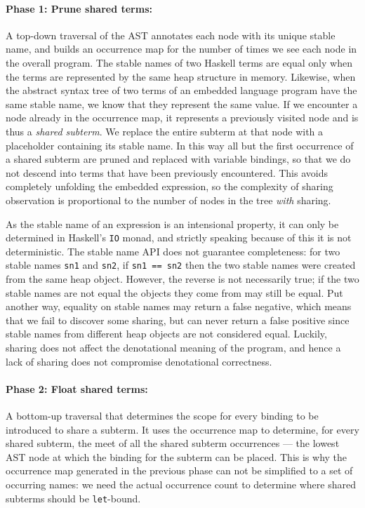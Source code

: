 \paragraph{Phase 1: Prune shared terms:}

A top-down traversal of the AST annotates each node
with its unique stable name, and builds an occurrence map for
the number of times we see each node in the overall program. The stable names of
two Haskell terms are equal only when the terms are represented by the same heap
structure in memory. Likewise, when the abstract syntax tree of two terms of an
embedded language program have the same stable name, we know that they represent
the same value. If we encounter a node already in the occurrence map, it represents a
previously visited node and is thus a \emph{shared subterm}. We replace the
entire subterm at that node with a placeholder containing its stable name. In
this way all but the first occurrence of a shared subterm are pruned and
replaced with variable bindings, so that we do not descend into terms that have
been previously encountered. This avoids completely unfolding the embedded
expression, so the complexity of sharing observation is proportional to the
number of nodes in the tree \emph{with} sharing.

As the stable name of an expression is an intensional property, it can only be
determined in Haskell's \lstinline{IO} monad, and strictly speaking because of
this it is not deterministic. The stable name API does not guarantee
completeness: for two stable names \lstinline{sn1} and \lstinline{sn2}, if
\lstinline{sn1 == sn2} then the two stable names were created from the same heap
object. However, the reverse is not necessarily true; if the two stable names
are not equal the objects they come from may still be equal. Put another way,
equality on stable names may return a false negative, which means that we fail
to discover some sharing, but can never return a false positive since stable
names from different heap objects are not considered equal. Luckily, sharing
does not affect the denotational meaning of the program, and hence a lack of
sharing does not compromise denotational correctness.


\paragraph{Phase 2: Float shared terms:}

A bottom-up traversal that determines the scope for every binding to be
introduced to share a subterm. It uses the occurrence map to determine, for
every shared subterm, the meet of all the shared subterm occurrences --- the
lowest AST node at which the binding for the subterm can be placed. This is why
the occurrence map generated in the previous phase can not be simplified to
a set of occurring names: we need the actual occurrence count to determine where
shared subterms should be \texttt{let}-bound.


